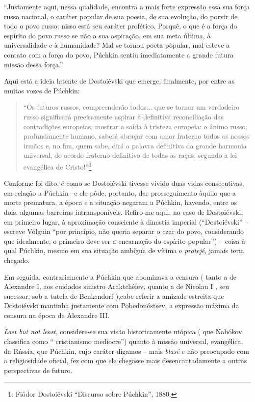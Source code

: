 ``Justamente aqui, nessa qualidade, encontra a mais forte expressão essa
sua força russa nacional, o caráter popular de sua poesia, de sua
evolução, do porvir de todo o povo russo: nisso está seu caráter
profético. Porquê, o que é a força do espírito do povo russo se não a
sua aspiração, em sua meta última, à universalidade e à humanidade? Mal
se tornou poeta popular, mal esteve a contato com a força do povo,
Púchkin sentiu imediatamente a grande futura missão dessa força.''

Aqui está a ideia latente de Dostoiévski que emerge, finalmente, por
entre as muitas vozes de Púchkin:

\begin{quote}
``Os futuros russos, compreenderão todos... que se tornar um verdadeiro
russo significará precisamente aspirar à definitiva reconciliação das
contradições europeias, mostrar a saída à tristeza europeia: o ânimo
russo, profundamente humano, saberá abraçar com amor fraterno todos os
nossos irmãos e, no fim, quem sabe, dirá a palavra definitiva da grande
harmonia universal, do acordo fraterno definitivo de todas as raças,
segundo a lei evangélica de Cristo!''\footnote{Fiódor Dostoiévski
  ``Discurso sobre Púchkin'', 1880.}
\end{quote}

Conforme foi dito, é como se Dostoiévski tivesse vivido duas vidas
consecutivas, em relação a Púchkin --e ele pôde, portanto, dar
prosseguimento àquilo que a morte prematura, a época e a situação
negaram a Púchkin, havendo, entre os dois, algumas barreiras
intransponíveis. Refiro-me aqui, no caso de Dostoiévski, em primeiro
lugar, à aproximação consciente à dinastia imperial (``Dostoiévski'' --
escreve Vólguin ``por princípio, não queria separar o czar do povo,
considerando que idealmente, o primeiro deve ser a encarnação do
espírito popular'') -- coisa à qual Púchkin, mesmo em sua situação
ambígua de vítima e \emph{protejé}, jamais teria chegado.

Em seguida, contrariamente a Púchkin que abominava a censura ( tanto a
de Alexandre I, aos cuidados sinistro Araktchêiev, quanto a de Nicolau I
, seu sucessor, sob a tutela de Benkendorf ),cabe referir a amizade
estreita que Dostoiévski mantinha justamente com Pobedonóstsev, a
expressão máxima da censura na época de Alexandre III.

\emph{Last but not least}, considere-se sua visão historicamente utópica
( que Nabókov classifica como `` cristianismo medíocre'') quanto à
missão universal, evangélica, da Rússia, que Púchkin, cujo caráter
digamos -- mais \emph{blasé} e não preocupado com a religiosidade
oficial, fez com que ele chegasse mais desencantadamente a outras
perspectivas de futuro.

